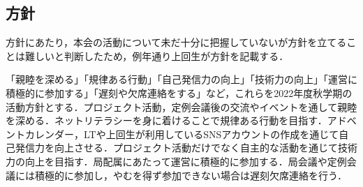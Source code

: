 \subsection*{\firstGrade{}方針}


\firstGrade{}方針にあたり，本会の活動について未だ十分に把握していない\firstGrade{}が方針を立てることは難しいと判断したため，例年通り上回生が\firstGrade{}方針を記載する．

「親睦を深める」「規律ある行動」「自己発信力の向上」「技術力の向上」「運営に積極的に参加する」「遅刻や欠席連絡をする」など，これらを\firstGrade{}2022年度秋学期の活動方針とする．プロジェクト活動，定例会議後の交流やイベントを通して親睦を深める．ネットリテラシーを身に着けることで規律ある行動を目指す．アドベントカレンダー，LTや上回生が利用しているSNSアカウントの作成を通じて自己発信力を向上させる．プロジェクト活動だけでなく自主的な活動を通じて技術力の向上を目指す．局配属にあたって運営に積極的に参加する．局会議や定例会議には積極的に参加し，やむを得ず参加できない場合は遅刻欠席連絡を行う．